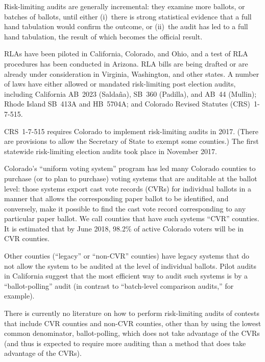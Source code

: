 \documentclass[12pt]{article}
\begin{document}
Risk-limiting audits are generally incremental: they examine more ballots, or batches of ballots,
until either (i)~there is strong statistical evidence that a full hand tabulation would confirm the outcome,
or (ii)~the audit has led to a full hand tabulation, the result of which becomes the official
result.

RLAs have been piloted in California, Colorado, and Ohio, and a test of
RLA procedures has been conducted in Arizona.
RLA bills are being drafted or are already under consideration in Virginia, Washington, and other states.
A number of laws have either allowed or mandated risk-limiting post election audits,
including California AB~2023 (Salda\~{n}a), SB~360 (Padilla), and AB~44 (Mullin);
Rhode Island SB~413A and HB~5704A; and Colorado Revised Statutes (CRS)~1-7-515.

CRS~1-7-515 requires 
Colorado to implement risk-limiting audits in 2017.
(There are provisions to allow the Secretary of State to exempt some counties.)
The first statewide risk-limiting election audits took place in November 2017. 

Colorado's ``uniform voting system'' program has led
many Colorado counties to purchase (or to plan to purchase) voting systems
that are auditable at the ballot level: those systems export cast vote records (CVRs)
for individual ballots in a manner that allows the corresponding paper ballot to be identified,
and conversely, make it possible to find the cast vote record corresponding to any
particular paper ballot.
We call counties that have such systems ``CVR'' counties.
It is estimated that by June 2018, 98.2\% of active Colorado voters will be in CVR counties.

Other counties (``legacy'' or ``non-CVR'' counties) 
have legacy systems that do not allow the system to be audited
at the level of individual ballots.
Pilot audits in California suggest that the most efficient way to audit such systems
is by a ``ballot-polling'' audit 
(in contrast to ``batch-level comparison audits,'' for example).

There is currently no literature on how to perform risk-limiting audits of contests
that include CVR counties and non-CVR counties, other than by using the lowest
common denominator, ballot-polling, which does not take advantage of the CVRs
(and thus is expected to require more auditing than a method that does take
advantage of the CVRs).
\end{document}
